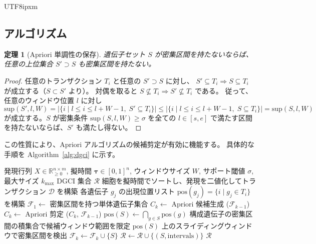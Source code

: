 \documentclass[11pt,a4paper]{article}
\newtheorem{theorem}{定理}
\begin{document}
\begin{CJK}{UTF8}{ipxm}
\subsection{アルゴリズム}

\begin{theorem}[Apriori 単調性の保存]
\label{thm:apriori-monotonicity}
遺伝子セット $S$ が密集区間を持たないならば、
任意の上位集合 $S' \supset S$ も密集区間を持たない。
\end{theorem}

\begin{proof}
任意のトランザクション $T_i$ と任意の $S' \supset S$ に対し、
$S' \subseteq T_i \Rightarrow S \subseteq T_i$ が成立する（$S \subset S'$ より）。
対偶を取ると $S \not\subseteq T_i \Rightarrow S' \not\subseteq T_i$ である。
従って、任意のウィンドウ位置 $l$ に対し
\begin{equation}
  \mathrm{sup}(S', l, W) = |\{i \mid l \leq i \leq l+W-1,\; S' \subseteq T_i\}|
  \leq |\{i \mid l \leq i \leq l+W-1,\; S \subseteq T_i\}| = \mathrm{sup}(S, l, W)
\end{equation}
が成立する。$S$ が密集条件 $\mathrm{sup}(S, l, W) \geq \sigma$ を全ての
$l \in [s, e]$ で満たす区間を持たないならば、$S'$ も満たし得ない。
\end{proof}

この性質により、Apriori アルゴリズムの候補剪定が有効に機能する。
具体的な手順を Algorithm~\ref{alg:dgci} に示す。

\begin{algorithm}[t]
\caption{DGCI マイニング}
\label{alg:dgci}
\begin{algorithmic}[1]
\Require 発現行列 $X \in \mathbb{R}_{\geq 0}^{n \times m}$, 擬時間 $\boldsymbol{\tau} \in [0,1]^n$, ウィンドウサイズ $W$, サポート閾値 $\sigma$, 最大サイズ $k_{\max}$
\Ensure DGCI 集合 $\mathcal{R}$
\State 細胞を擬時間でソートし、発現を二値化してトランザクション $\mathcal{D}$ を構築
\State 各遺伝子 $g_j$ の出現位置リスト $\mathrm{pos}(g_j) = \{i \mid g_j \in T_i\}$ を構築
\State $\mathcal{F}_1 \gets$ 密集区間を持つ単体遺伝子集合
  \State $C_k \gets$ Apriori 候補生成 ($\mathcal{F}_{k-1}$)
  \State $C_k \gets$ Apriori 剪定 ($C_k$, $\mathcal{F}_{k-1}$)
    \State $\mathrm{pos}(S) \gets \bigcap_{g \in S} \mathrm{pos}(g)$ 
    \State 構成遺伝子の密集区間の積集合で候補ウィンドウ範囲を限定
    \State $\mathrm{pos}(S)$ 上のスライディングウィンドウで密集区間を検出
      \State $\mathcal{F}_k \gets \mathcal{F}_k \cup \{S\}$
      \State $\mathcal{R} \gets \mathcal{R} \cup \{(S, \text{intervals})\}$
    \EndIf
  \EndFor
\EndFor
\State \Return $\mathcal{R}$
\end{algorithmic}
\end{algorithm}


\end{CJK}
\end{document}
